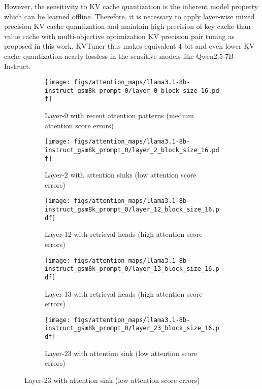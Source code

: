 However, the sensitivity to KV cache quantization is the inherent model property which can be learned offline. Therefore, it is necessary to apply layer-wise mixed precision KV cache quantization and maintain high precision of key cache than value cache with multi-objective optimization KV precision pair tuning as proposed in this work. KVTuner thus makes equivalent 4-bit and even lower KV cache quantization nearly lossless in the sensitive models like Qwen2.5-7B-Instruct.

\begin{figure}
    \centering
    \begin{subfigure}{0.72\columnwidth}
    \texttt{[image: figs/attention\_maps/llama3.1-8b-instruct\_gsm8k\_prompt\_0/layer\_0\_block\_size\_16.pdf]}
    \caption{Layer-0 with recent attention patterns (medium attention score errors)}
    \label{fig:attention_pattern_Llama3.1-8B-Instruct_gsm8k_zeroshot_first_prompt_layer_0}
    \end{subfigure}
    \begin{subfigure}{0.72\columnwidth}
    \texttt{[image: figs/attention\_maps/llama3.1-8b-instruct\_gsm8k\_prompt\_0/layer\_2\_block\_size\_16.pdf]}
    \caption{Layer-2 with attention sinks (low attention score errors)}
    \label{fig:attention_pattern_Llama3.1-8B-Instruct_gsm8k_zeroshot_first_prompt_layer_2}
    \end{subfigure}
    \begin{subfigure}{0.72\columnwidth}
    \texttt{[image: figs/attention\_maps/llama3.1-8b-instruct\_gsm8k\_prompt\_0/layer\_12\_block\_size\_16.pdf]}
    \caption{Layer-12 with retrieval heads (high attention score errors)}
    \label{fig:attention_pattern_Llama3.1-8B-Instruct_gsm8k_zeroshot_first_prompt_layer_12}
    \end{subfigure}
    \begin{subfigure}{0.72\columnwidth}
    \texttt{[image: figs/attention\_maps/llama3.1-8b-instruct\_gsm8k\_prompt\_0/layer\_13\_block\_size\_16.pdf]}
    \caption{Layer-13 with retrieval heads (high attention score errors)}
    \label{fig:attention_pattern_Llama3.1-8B-Instruct_gsm8k_zeroshot_first_prompt_layer_13}
    \end{subfigure}
    \begin{subfigure}{0.72\columnwidth}
    \texttt{[image: figs/attention\_maps/llama3.1-8b-instruct\_gsm8k\_prompt\_0/layer\_23\_block\_size\_16.pdf]}
    \caption{Layer-23 with attention sink (low attention score errors)}
    \label{fig:attention_pattern_Llama3.1-8B-Instruct_gsm8k_zeroshot_first_prompt_layer_23}

\end{subfigure}
\end{figure}
